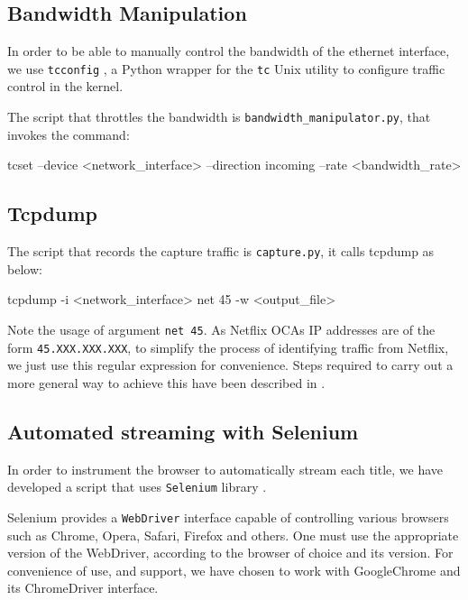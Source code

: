 \subsection{Bandwidth Manipulation}

In order to be able to manually control the bandwidth of the ethernet
interface, we use \texttt{tcconfig} \cite{tcconfig}, a Python wrapper for the
\texttt{tc} \cite{tc} Unix utility to configure traffic control in the kernel.

The script that throttles the bandwidth is \texttt{bandwidth\_manipulator.py},
that invokes the command:

\begin{bash_script}[caption={Enforce a bandwidth rate on the specified interface}, label={tcconfig}]
tcset --device <network_interface> --direction incoming --rate <bandwidth_rate>
\end{bash_script}


\subsection{Tcpdump}

The script that records the capture traffic is \texttt{capture.py}, it calls tcpdump as below:

\begin{bash_script}[caption={Listens for TCP/IP traffic on the specified interface}, label={tcpdump}]
tcpdump -i <network_interface> net 45 -w <output_file>
\end{bash_script}

Note the usage of argument \texttt{net 45}. As Netflix OCAs IP addresses are of
the form \texttt{45.XXX.XXX.XXX}, to simplify the process of identifying
traffic from Netflix, we just use this regular expression for convenience.
Steps required to carry out a more general way to achieve this have been
described in .

\subsection{Automated streaming with Selenium}

In order to instrument the browser to automatically stream each title, we have
developed a script that uses \texttt{Selenium} library \cite{selenium}.

Selenium provides a \texttt{WebDriver} interface capable of controlling various
browsers such as Chrome, Opera, Safari, Firefox and others. One must use the
appropriate version of the WebDriver, according to the browser of choice and
its version. For convenience of use, and support, we have chosen to work with
GoogleChrome and its ChromeDriver interface.

